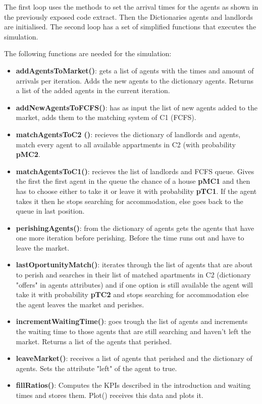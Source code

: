 The first loop uses the methods to set the arrival times for the agents as shown in the previously exposed code extract. Then the Dictionaries agents and landlords are initialised. The second loop has a set of simplified functions that executes the  simulation. 

The following functions are needed for the simulation:

\begin{itemize}
        \item \textbf{addAgentsToMarket()}: gets a list of agents with the times and amount of arrivals per iteration. Adds the new agents to the dictionary agents. Returns a list of the added agents in the current iteration.
        \item \textbf{addNewAgentsToFCFS()}: has as input the list of new agents added to the market, adds them to the matching system of C1 (FCFS).
        \item \textbf{matchAgentsToC2 ()}: recieves the dictionary of landlords and agents, match every agent to all available appartments in C2 (with probability \textbf{pMC2}.
        \item \textbf{matchAgentsToC1()}: recieves the list of landlords and FCFS queue. Gives the first the first agent in the queue the chance of a house \textbf{pMC1} and then has to choose either to take it or leave it with probability \textbf{pTC1}. If the agent takes it then he stops searching for accommodation, else goes back to the queue in last position. 
        \item \textbf{perishingAgents()}: from the dictionary of agents gets the agents that have one more iteration before perishing. Before the time runs out and have to leave the market.
        \item \textbf{lastOportunityMatch()}: iterates through the list of agents that are about to perish and searches in their list of matched apartments in C2 (dictionary "offers" in agents attributes) and if one option is still available the agent will take it with probability \textbf{pTC2} and stops searching for accommodation else the agent leaves the market and perishes.
        \item \textbf{incrementWaitingTime()}: goes trough the list of agents and increments the waiting time to those agents that are still searching and haven't left the market. Returns a list of the agents that perished.
        \item \textbf{leaveMarket()}: receives a list of agents that perished and the dictionary of agents. Sets the attribute "left" of the agent to true.
        \item \textbf{fillRatios()}: Computes the KPIs described in the introduction and waiting times and stores them. Plot() receives this data and plots it.
\end{itemize}

